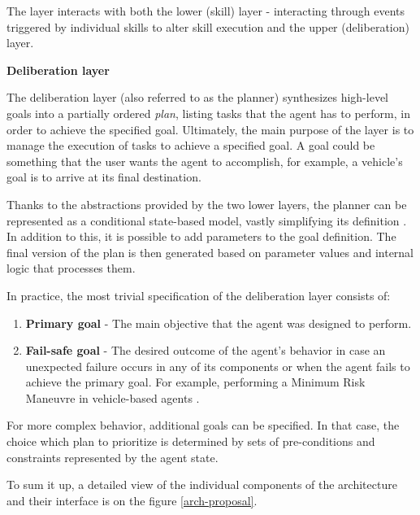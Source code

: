 \documentclass[0main.tex]{subfiles}
\begin{document}
The layer interacts with both the lower (skill) layer - interacting through events triggered by
individual skills to alter skill execution and the upper (deliberation) layer. 
 
\textbf{Deliberation layer}

The deliberation layer (also referred to as the planner) synthesizes high-level goals into a
partially ordered \emph{plan}, listing tasks that the agent has to perform, in order to achieve
the specified goal. Ultimately, the main purpose of the layer is to manage the execution of
tasks to achieve a specified goal. A goal could be something that the user wants the agent to
accomplish, for example, a vehicle's goal is to arrive at its final destination.

Thanks to the abstractions provided by the two lower layers, the planner can be represented as
a conditional state-based model, vastly simplifying its definition \cite{Bonasso1995}. In
addition to this, it is possible to add parameters to the goal definition. The final version of the plan 
is then generated based on parameter values and internal logic that processes them.

In practice, the most trivial specification of the deliberation layer consists of:

\begin{enumerate}[label=\alph*)]
    \item \textbf{Primary goal} - The main objective that the agent was designed to perform.
    \item \textbf{Fail-safe goal} - The desired outcome of the agent's behavior in case an unexpected 
    failure occurs in any of its components or when the agent fails to achieve the primary goal. 
    For example, performing a Minimum Risk Maneuvre in vehicle-based agents
    \cite{WorkingAutonomous2022}. %
 \end{enumerate}

For more complex behavior, additional goals can be specified. In that case, the choice which 
plan to prioritize is determined by sets of pre-conditions and constraints represented by
the agent state.

To sum it up, a detailed view of the individual components of the architecture and their
interface is on the figure \ref{arch-proposal}.
\end{document}
